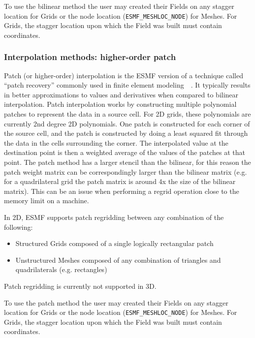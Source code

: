 \smallskip

 To use the bilinear method the user may created their Fields on any stagger location for Grids or the node location ({\tt ESMF\_MESHLOC\_NODE}) for Meshes.
 For Grids, the stagger location upon which the Field was built must contain coordinates. 

\subsubsection{Interpolation methods: higher-order patch}

 Patch (or higher-order) interpolation is the ESMF version of a technique called ``patch recovery'' commonly
 used in finite element modeling~\cite{PatchInterp1}~\cite{PatchInterp2}. It typically results in better approximations to 
 values and derivatives when compared to bilinear interpolation.
 Patch interpolation works by constructing multiple polynomial patches to represent
 the data in a source cell. For 2D grids, these polynomials
 are currently 2nd degree 2D polynomials. One patch is constructed for each corner of the source cell, and the patch is constructed 
 by doing a least squared fit through the data in the cells surrounding the corner. The interpolated value at the destination point is 
 then a weighted average of the values of the patches at that point. The patch method has a larger
 stencil than the bilinear, for this reason the patch weight matrix can be correspondingly larger
 than the bilinear matrix (e.g. for a quadrilateral grid the patch matrix is around 4x the size of
 the bilinear matrix). This can be an issue when performing a regrid operation close to the memory
 limit on a machine.  

\smallskip

 In 2D, ESMF supports patch regridding between any combination of the following:
 \begin{itemize}
 \item Structured Grids composed of a single logically rectangular patch
 \item Unstructured Meshes composed of any combination of triangles and quadrilaterals (e.g. rectangles)
 \end{itemize}

\smallskip

 Patch regridding is currently not supported in 3D.

\smallskip

 To use the patch method the user may created their Fields on any stagger location for Grids or the node location ({\tt ESMF\_MESHLOC\_NODE}) for Meshes.
 For Grids, the stagger location upon which the Field was built must contain coordinates. 


